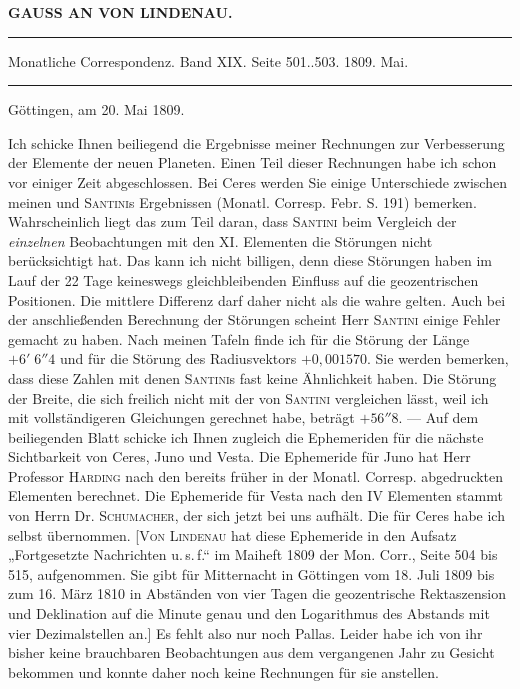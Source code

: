\clearpage
{}
\hypertarget{native-316-lower}{}
\begin{center}
\textbf{GAUSS AN VON LINDENAU.}

\par\vspace{4pt}\hrule\vspace{4pt}
\fontsize{10}{12}\selectfont Monatliche Correspondenz. Band XIX. Seite 501..503. 1809. Mai.
\par\vspace{4pt}\hrule\vspace{4pt}
\end{center}

\begin{flushright}Göttingen, am 20. Mai 1809.\end{flushright}

\par\indent Ich schicke Ihnen beiliegend die Ergebnisse meiner Rechnungen zur Verbesserung der Elemente der neuen Planeten. Einen Teil dieser Rechnungen habe ich schon vor einiger Zeit abgeschlossen. Bei Ceres werden Sie einige Unterschiede zwischen meinen und \textsc{Santini}s Ergebnissen (Monatl. Corresp. Febr. S. 191) bemerken. Wahrscheinlich liegt das zum Teil daran, dass \textsc{Santini} beim Vergleich der \emph{einzelnen} Beobachtungen mit den XI. Elementen die Störungen nicht berücksichtigt hat. Das kann ich nicht billigen, denn diese Störungen haben im Lauf der 22 Tage keineswegs gleichbleibenden Einfluss auf die geozentrischen Positionen. Die mittlere Differenz darf daher nicht als die wahre gelten. Auch bei der anschließenden Berechnung der Störungen scheint Herr \textsc{Santini} einige Fehler gemacht zu haben. Nach meinen Tafeln finde ich für die Störung der Länge $+6'\;6''4$ und für die Störung des Radiusvektors $+0{,}001570$. Sie werden bemerken, dass diese Zahlen mit denen \textsc{Santini}s fast keine Ähnlichkeit haben. Die Störung der Breite, die sich freilich nicht mit der von \textsc{Santini} vergleichen lässt, weil ich mit vollständigeren Gleichungen gerechnet habe, beträgt $+56''8$. — Auf dem beiliegenden Blatt schicke ich Ihnen zugleich die Ephemeriden für die nächste Sichtbarkeit von Ceres, Juno und Vesta. Die Ephemeride für Juno hat Herr Professor \textsc{Harding} nach den bereits früher in der Monatl. Corresp. abgedruckten Elementen berechnet. Die Ephemeride für Vesta nach den IV Elementen stammt von Herrn Dr. \textsc{Schumacher}, der sich jetzt bei uns aufhält. Die für Ceres habe ich selbst übernommen. [\textsc{Von Lindenau} hat diese Ephemeride in den Aufsatz „Fortgesetzte Nachrichten u.\,s.\,f.“ im Maiheft 1809 der Mon. Corr., Seite 504 bis 515, aufgenommen. Sie gibt für Mitternacht in Göttingen vom 18. Juli 1809 bis zum 16. März 1810 in Abständen von vier Tagen die geozentrische Rektaszension und Deklination auf die Minute genau und den Logarithmus des Abstands mit vier Dezimalstellen an.] Es fehlt also nur noch Pallas. Leider habe ich von ihr bisher keine brauchbaren Beobachtungen aus dem vergangenen Jahr zu Gesicht bekommen und konnte daher noch keine Rechnungen für sie anstellen.

